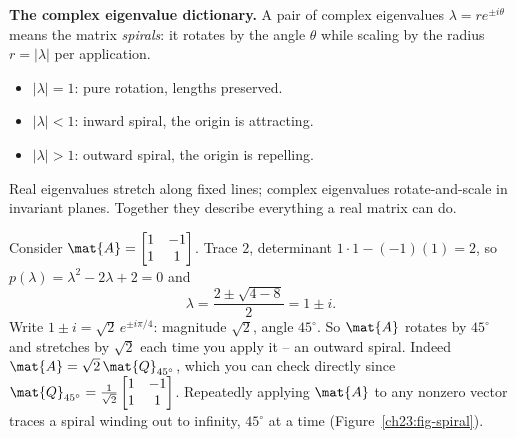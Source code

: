\begin{focusbox}
\textbf{The complex eigenvalue dictionary.} A pair of complex eigenvalues
$\lambda=r e^{\pm i\theta}$ means the matrix \emph{spirals}: it rotates by the
angle $\theta$ while scaling by the radius $r=|\lambda|$ per application.
\begin{itemize}
  \item $|\lambda|=1$: pure rotation, lengths preserved.
  \item $|\lambda|<1$: inward spiral, the origin is attracting.
  \item $|\lambda|>1$: outward spiral, the origin is repelling.
\end{itemize}
Real eigenvalues stretch along fixed lines; complex eigenvalues rotate-and-scale
in invariant planes. Together they describe everything a real matrix can do.
\end{focusbox}

\begin{example}
\label{ch23:ex-spiral}
Consider $\mat{A}=\begin{bmatrix}1 & -1\\ 1 & 1\end{bmatrix}$. Trace $2$,
determinant $1\cdot 1-(-1)(1)=2$, so
$p(\lambda)=\lambda^2-2\lambda+2=0$ and
\[
  \lambda=\frac{2\pm\sqrt{4-8}}{2}=1\pm i.
\]
Write $1\pm i=\sqrt{2}\,e^{\pm i\pi/4}$: magnitude $\sqrt 2$, angle $45^\circ$. So
$\mat{A}$ rotates by $45^\circ$ and stretches by $\sqrt2$ each time you apply it --
an outward spiral. Indeed $\mat{A}=\sqrt2\,\mat{Q}_{45^\circ}$, which you can check
directly since $\mat{Q}_{45^\circ}=\tfrac{1}{\sqrt2}\begin{bmatrix}1&-1\\1&1\end{bmatrix}$.
Repeatedly applying $\mat{A}$ to any nonzero vector traces a spiral winding out to
infinity, $45^\circ$ at a time (Figure~\ref{ch23:fig-spiral}).
\end{example}

